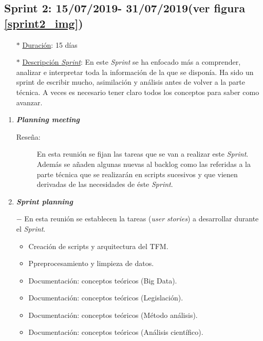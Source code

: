 \subsection{Sprint 2: 15/07/2019- 31/07/2019(ver figura \ref{sprint2_img})}\label{sprint2}
\begin{itemize}
\item[$\ast$] \underline{Duración}:  15 días
\item[$\ast$] \underline{Descripción \textit{Sprint}}: En este \textit{Sprint} se ha enfocado más a comprender, analizar e interpretar toda la información de la que se disponía. Ha sido un sprint de escribir mucho, asimilación y análisis antes de volver a la parte técnica. A veces es necesario tener claro todos los conceptos para saber como avanzar. 
\end{itemize}
\begin{enumerate}
\item \textbf{\textit{Planning meeting}}
\begin{description}
	\item[Reseña:] En esta reunión se fijan las tareas que se van a realizar este \textit{Sprint}. Además se añaden algunas nuevas al backlog como las referidas a la parte técnica que se realizarán en scripts sucesivos y que vienen derivadas de las necesidades de éste \textit{Sprint}.
\end{description}
\item \textbf{\textit{Sprint planning}}
	\item[$-$] En esta reunión se establecen la tareas (\textit{user stories}) a desarrollar durante el \textit{Sprint}. 
\begin{itemize}
	\item Creación de scripts y arquitectura del TFM.
	\item Ppreprocesamiento y limpieza de datos.
	\item Documentación: conceptos teóricos (Big Data).
	\item Documentación: conceptos teóricos (Legislación).
	\item Documentación: conceptos teóricos (Método análisis).
	\item Documentación: conceptos teóricos (Análisis científico).


\end{itemize}
\end{enumerate}
